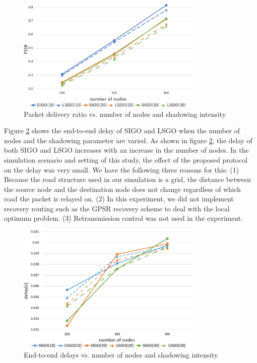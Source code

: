 \documentclass[conference]{IEEEtran}
\begin{document}
\begin{figure}[!ht]
\centering
\includegraphics[width=90mm]{figures/PDR.eps}
\caption{Packet delivery ratio vs. number of nodes and shadowing intensity}
\label{fig:PDR}
\end{figure}


Figure \ref{fig:delay} shows the end-to-end delay of SIGO and LSGO when the number of nodes and the shadowing parameter are varied. 
As shown in figure \ref{fig:delay}, the delay of both SIGO and LSGO increases with an increase in the number of nodes. In the simulation scenario and setting of this study, the effect of the proposed protocol on the delay was very small. 
We have the following three reasons for this: 
(1) Because the road structure used in our simulation is a grid, the distance between the source node and the destination node does not change regardless of which road the packet is relayed on.
(2) In this experiment, we did not implement recovery routing such as the GPSR recovery scheme to deal with the local optimum problem. (3) Retransmission control was not used in the experiment.







\begin{figure}[!ht]
\centering
\includegraphics[width=90mm]{figures/delay.eps}
\caption{End-to-end delays vs. number of nodes and shadowing intensity }
\label{fig:delay}
\end{figure}
\end{document}
